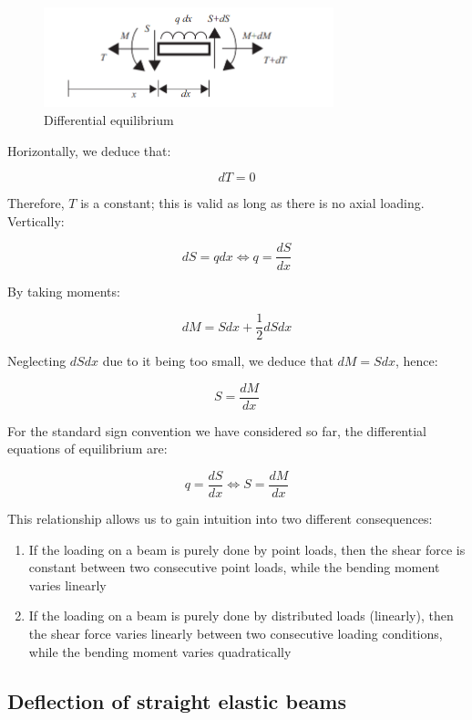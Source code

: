 \documentclass{article}
\begin{document}
\begin{figure}[h]
    \centering
    \includegraphics[width = 0.75\textwidth]{images/diffeq.png}
    \caption{Differential equilibrium}
    \label{fig:enter-label}
\end{figure}

Horizontally, we deduce that:

\[ dT = 0 \]

Therefore, $T$ is a constant; this is valid as long as there is no axial loading. Vertically:

\[ dS = qdx \iff q = \frac{dS}{dx} \]

By taking moments:

\[ dM = Sdx + \frac{1}{2}dSdx \]

Neglecting $dSdx$ due to it being too small, we deduce that $dM = Sdx$, hence:

\[ S = \frac{dM}{dx} \]

\begin{theorem}
    For the standard sign convention we have considered so far, the differential equations of equilibrium are:

    \[ q = \frac{dS}{dx} \iff S = \frac{dM}{dx} \]
\end{theorem}

This relationship allows us to gain intuition into two different consequences:

\begin{enumerate}
    \item If the loading on a beam is purely done by point loads, then the shear force is constant between two consecutive point loads, while the bending moment varies linearly
    \item If the loading on a beam is purely done by distributed loads (linearly), then the shear force varies linearly between two consecutive loading conditions, while the bending moment varies quadratically
\end{enumerate}

\newpage

\subsection{Deflection of straight elastic beams}
\end{document}
